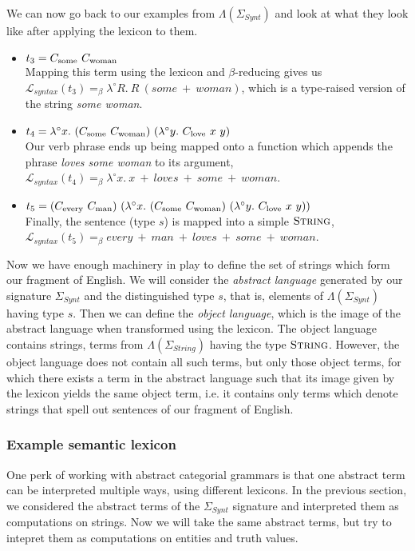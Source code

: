 We can now go back to our examples from $\Lambda(\Sigma_{Synt})$ and
look at what they look like after applying the lexicon to them.
\begin{itemize}
\item $t_3 = \synt{some}\ \synt{woman}$ \\ Mapping this term using the
  lexicon and $\beta$-reducing gives us $\mathcal{L}_{syntax}(t_3)
  =_{\beta} \lambda^{\circ} R.\ R\ (some\ +\ woman)$, which is a
  type-raised version of the string \emph{some woman}.
\item $t_4 = \lambda^{\circ}
  x.\ (C_{\textrm{some}}\ C_{\textrm{woman}})\ (\lambda^{\circ}
  y.\ C_{\textrm{love}}\ x\ y)$ \\ Our verb phrase ends up being mapped onto
  a function which appends the phrase \emph{loves some woman} to its
  argument, $\mathcal{L}_{syntax}(t_4) =_{\beta} \lambda^{\circ}
  x.\ x\ +\ loves\ +\ some\ +\ woman$.
\item $t_5 = (\synt{every}\ \synt{man})\ (\lambda^{\circ}
  x.\ (\synt{some}\ \synt{woman})\ (\lambda^{\circ}
  y.\ \synt{love}\ x\ y))$ \\ Finally, the sentence (type $s$) is mapped
  into a simple $\textsc{String}$, $\mathcal{L}_{syntax}(t_5) =_{\beta}
  every\ +\ man\ +\ loves\ +\ some\ +\ woman$.
\end{itemize}

Now we have enough machinery in play to define the set of strings which
form our fragment of English. We will consider the \emph{abstract
  language} generated by our signature $\Sigma_{Synt}$ and the
distinguished type $s$, that is, elements of $\Lambda(\Sigma_{Synt})$
having type $s$. Then we can define the \emph{object language}, which is
the image of the abstract language when transformed using the
lexicon. The object language contains strings, terms from
$\Lambda(\Sigma_{String})$ having the type $\textsc{String}$. However,
the object language does not contain all such terms, but only those
object terms, for which there exists a term in the abstract language
such that its image given by the lexicon yields the same object term,
i.e. it contains only terms which denote strings that spell out
sentences of our fragment of English.

\subsubsection{Example semantic lexicon}
\label{sssec:acg-sem}

One perk of working with abstract categorial grammars is that one
abstract term can be interpreted multiple ways, using different
lexicons. In the previous section, we considered the abstract terms of
the $\Sigma_{Synt}$ signature and interpreted them as computations on
strings. Now we will take the same abstract terms, but try to intepret
them as computations on entities and truth values.

